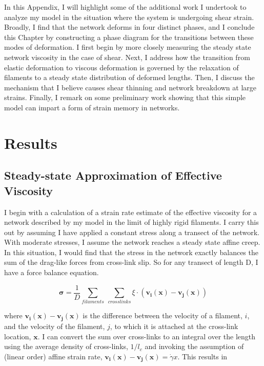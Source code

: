 











In this Appendix, I will highlight some of the additional work I undertook to analyze my model in the situation where the system is undergoing shear strain.  Broadly, I find that the network deforms in four distinct phases, and I conclude this Chapter by constructing a phase diagram for the transitions between these modes of deformation. I first begin by more closely measuring the steady state network viscosity in the case of shear.  Next, I address how the transition from elastic deformation to viscous deformation is governed by the relaxation of filaments to a steady state distribution of deformed lengths.  Then, I discuss the mechanism that I believe causes shear thinning and network breakdown at large strains.  Finally, I remark on some preliminary work showing that this simple model can impart a form of strain memory in networks. 






\section{Results}



\subsection{Steady-state Approximation of Effective Viscosity}
\label{sec:eff_vic}
I begin with a calculation of a strain rate estimate of the effective viscosity for a network described by my model in the limit of highly rigid filaments.  I carry this out by assuming I have applied a constant stress along a transect of the network.  With moderate stresses, I assume the network reaches a steady state affine creep. In this situation, I would find that the stress in the network exactly balances the sum of the drag-like forces from cross-link slip.  So for any transect of length D, I have a force balance equation.

\begin{equation}
\mathbf{\sigma} = \frac{1}{D}\sum_{filaments}\: \sum_{crosslinks}\xi \cdot (\mathbf{v_i(x)}-\mathbf{v_j(x)})
\end{equation}

where $\mathbf{v_i(x)}-\mathbf{v_j(x)}$ is the difference between the velocity of a filament, $i$, and the velocity of the filament, $j$, to which it is attached at the cross-link location, $\mathbf{x}$. I can convert the sum over cross-links to an integral over the length using the average density of cross-links, $1/l_c$ and invoking the assumption of (linear order) affine strain rate, $\mathbf{v_i(x)}-\mathbf{v_j(x)}=\dot \gamma x$. This results in

